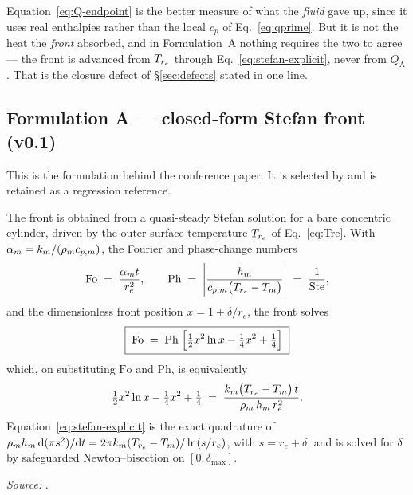 Equation~\eqref{eq:Q-endpoint} is the better measure of what the \emph{fluid}
gave up, since it uses real enthalpies rather than the local $c_{p}$ of
Eq.~\eqref{eq:qprime}. But it is not the heat the \emph{front} absorbed, and in
Formulation~A nothing requires the two to agree --- the front is advanced from
$T_{r_{e}}$ through Eq.~\eqref{eq:stefan-explicit}, never from $Q_{\mathrm{A}}$.
That is the closure defect of \S\ref{sec:defects} stated in one line.

\subsection{Formulation A --- closed-form Stefan front (v0.1)}
\label{sec:front:legacy}

This is the formulation behind the conference paper. It is selected by
 and is retained as a regression reference.

The front is obtained from a quasi-steady Stefan solution for a bare concentric
cylinder, driven by the outer-surface temperature $T_{r_{e}}$ of
Eq.~\eqref{eq:Tre}. With $\alpha_{m}=k_{m}/(\rho_{m} c_{p,m})$, the Fourier and
phase-change numbers
\begin{equation}
  \mathrm{Fo} \;=\; \frac{\alpha_{m}t}{r_{e}^{2}},
  \qquad
  \mathrm{Ph} \;=\;
  \left|\frac{h_{m}}{c_{p,m}\bigl(T_{r_{e}}-T_{m}\bigr)}\right|
  \;=\; \frac{1}{\mathrm{Ste}},
\end{equation}
and the dimensionless front position $x = 1 + \delta/r_{e}$, the front solves
\begin{equation}
  \boxed{\;
  \mathrm{Fo} \;=\; \mathrm{Ph}\;\Bigl[
    \tfrac{1}{2}x^{2}\ln x - \tfrac{1}{4}x^{2} + \tfrac{1}{4}
  \Bigr]
  \;}
  \label{eq:stefan-implicit}
\end{equation}
which, on substituting $\mathrm{Fo}$ and $\mathrm{Ph}$, is equivalently
\begin{equation}
  \tfrac{1}{2}x^{2}\ln x - \tfrac{1}{4}x^{2} + \tfrac{1}{4}
  \;=\;
  \frac{k_{m}\bigl(T_{r_{e}}-T_{m}\bigr)\,t}{\rho_{m}\,h_{m}\,r_{e}^{2}} .
  \label{eq:stefan-explicit}
\end{equation}
Equation~\eqref{eq:stefan-explicit} is the exact quadrature of
$\rho_{m}h_{m}\,\mathrm{d}(\pi s^{2})/\mathrm{d}t = 2\pi k_{m}(T_{r_{e}}-T_{m})/\ln(s/r_{e})$,
with $s=r_{e}+\delta$, and is solved for $\delta$ by safeguarded
Newton--bisection on $[0,\delta_{\max}]$.

\emph{Source:} .

